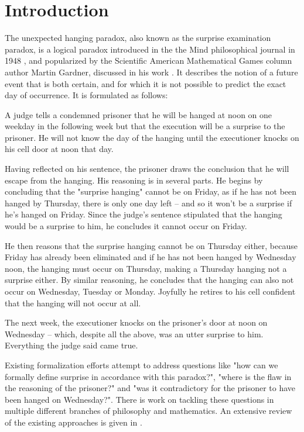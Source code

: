 \documentclass[runningheads]{llncs}
\newenvironment{myindent}{\begin{adjustwidth}{1cm}{}}{\end{adjustwidth}}
\begin{document}
\section{Introduction}

The unexpected hanging paradox, also known as the surprise examination paradox,
is a logical paradox introduced in the the Mind philosophical journal in 1948 \cite{original},
and popularized by the Scientific American Mathematical
Games column author Martin Gardner, discussed in his work \cite{diversions}.
It describes the notion of a future event that
is both certain, and for which it is not possible to predict the exact day of occurrence. It is
formulated as follows: \newline

\begin{myindent}
  A judge tells a condemned prisoner that he will be hanged at noon on one weekday
  in the following week but that the execution will be a surprise to the prisoner.
  He will not know the day of the hanging until the executioner knocks on his cell door at noon that day.

  Having reflected on his sentence, the prisoner draws the conclusion that he will
  escape from the hanging. His reasoning is in several parts. He begins by concluding
  that the "surprise hanging" cannot be on Friday, as if he has not been hanged by
  Thursday, there is only one day left – and so it won't be a surprise if he's hanged on
  Friday. Since the judge's sentence stipulated that the hanging would be a surprise
  to him, he concludes it cannot occur on Friday.

  He then reasons that the surprise hanging cannot be on Thursday either, because
  Friday has already been eliminated and if he has not been hanged by Wednesday noon,
  the hanging must occur on Thursday, making a Thursday hanging not a surprise either.
  By similar reasoning, he concludes that the hanging can also not occur on Wednesday,
  Tuesday or Monday. Joyfully he retires to his cell confident that the hanging will
  not occur at all.

  The next week, the executioner knocks on the prisoner's door at noon on Wednesday –
  which, despite all the above, was an utter surprise to him. Everything the judge said came true. \newline
\end{myindent}

Existing formalization efforts attempt to address questions like "how can we formally
define surprise in accordance with this paradox?", "where is the flaw in the
reasoning of the prisoner?" and "was it contradictory for the prisoner to have been
hanged on Wednesday?". There is work on tackling these questions in multiple
different branches of philosophy and mathematics.
An extensive review of the existing approaches is given in \cite{extensivereview}.
\end{document}
